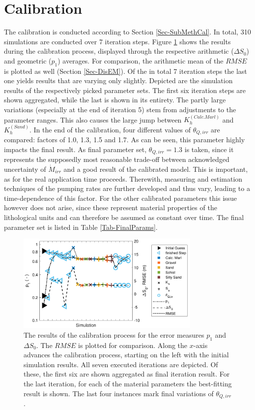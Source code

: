 \section{Calibration}

The calibration is conducted according to Section \ref{Sec-SubMethCal}. 
In total, 310 simulations are conducted over 7 iteration steps. 
Figure \ref{Fig-CalibResults} shows the results during the calibration process, displayed through the respective arithmetic ($\Delta S_0$) and geometric ($p_1$) averages. 
For comparison, the arithmetic mean of the $RMSE$ is plotted as well (Section \ref{Sec-DisEM}). 
Of the in total 7 iteration steps the last one yields results that are varying only slightly. 
Depicted are the simulation results of the respectively picked parameter sets. 
The first six iteration steps are shown aggregated, while the last is shown in its entirety. 
The partly large variations (especially at the end of iteration 5) stem from adjustments to the parameter ranges. 
This also causes the large jump between $K_h^{(Calc. Marl)}$ and $K_h^{(Sand)}$. 
In the end of the calibration, four different values of $\theta_{Q,irr}$ are compared: factors of 1.0, 1.3, 1.5 and 1.7. 
As can be seen, this parameter highly impacts the final result. 
As final parameter set, $\theta_{Q,irr}=1.3$ is taken, since it represents the supposedly most reasonable trade-off between acknowledged uncertainty of $\dot{M}_{irr}$ and a good result of the calibrated model. 
This is important, as for the real application time proceeds. 
Therewith, measuring and estimation techniques of the pumping rates are further developed and thus vary, leading to a time-dependence of this factor. 
For the other calibrated parameters this issue however does not arise, since these represent material properties of the lithological units and can therefore be assumed as constant over time. 
The final parameter set is listed in Table \ref{Tab-FinalParams}.

\begin{figure}[h]
    \centering
    \includegraphics[width=0.8\textwidth]{./img/Fig-CalibResults.pdf}
    \caption{The results of the calibration process for the error measures $p_1$ and $\Delta S_0$. The $RMSE$ is plotted for comparison. Along the $x$-axis advances the calibration process, starting on the left with the initial simulation results. All seven executed iterations are depicted. Of these, the first six are shown aggregated as final iteration result. For the last iteration, for each of the material parameters the best-fitting result is shown. The last four instances mark final variations of $\theta_{Q,irr}$.}
    \label{Fig-CalibResults}
\end{figure}


